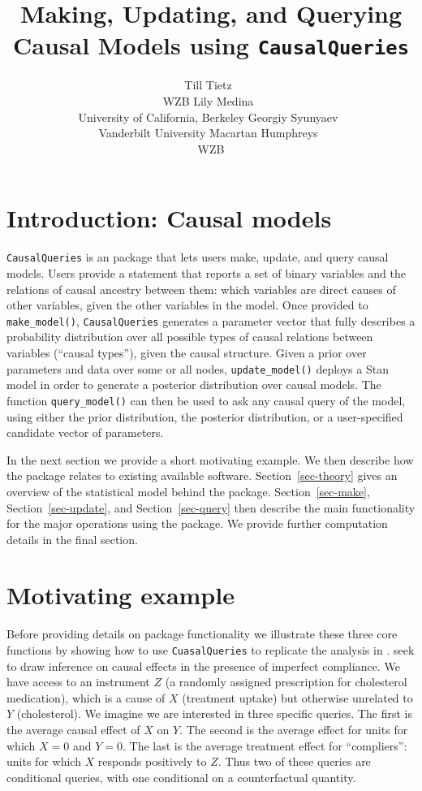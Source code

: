 \documentclass[
  11pt,
  article]{jss}
\author{Till Tietz~\orcidlink{0000-0002-2916-9059}\\WZB \And Lily
Medina~\orcidlink{0009-0004-2423-524X}\\University of California,
Berkeley \AND Georgiy
Syunyaev~\orcidlink{0000-0002-4391-6313}\\Vanderbilt
University \And Macartan Humphreys~\orcidlink{0000-0001-7029-2326}\\WZB}
\title{Making, Updating, and Querying Causal Models using
\texttt{CausalQueries}}
\begin{document}
\maketitle
\hypertarget{sec-intro}{%
\section{Introduction: Causal models}\label{sec-intro}}

\texttt{CausalQueries} is an  package that lets users make,
update, and query causal models. Users provide a statement that reports
a set of binary variables and the relations of causal ancestry between
them: which variables are direct causes of other variables, given the
other variables in the model. Once provided to \texttt{make\_model()},
\texttt{CausalQueries} generates a parameter vector that fully describes
a probability distribution over all possible types of causal relations
between variables (``causal types''), given the causal structure. Given
a prior over parameters and data over some or all nodes,
\texttt{update\_model()} deploys a Stan \citep{carpenter_stan_2017}
model in order to generate a posterior distribution over causal models.
The function \texttt{query\_model()} can then be used to ask any causal
query of the model, using either the prior distribution, the posterior
distribution, or a user-specified candidate vector of parameters.

In the next section we provide a short motivating example. We then
describe how the package relates to existing available software.
Section~\ref{sec-theory} gives an overview of the statistical model
behind the package. Section~\ref{sec-make}, Section~\ref{sec-update},
and Section~\ref{sec-query} then describe the main functionality for the
major operations using the package. We provide further computation
details in the final section.

\hypertarget{motivating-example}{%
\section{Motivating example}\label{motivating-example}}

Before providing details on package functionality we illustrate these
three core functions by showing how to use \texttt{CuasalQueries} to
replicate the analysis in
\citetext{\citealp{chickering_clinicians_1996}; \citealp[see
also][]{humphreys_integrated_2023}}. \citet{chickering_clinicians_1996}
seek to draw inference on causal effects in the presence of imperfect
compliance. We have access to an instrument \(Z\) (a randomly assigned
prescription for cholesterol medication), which is a cause of \(X\)
(treatment uptake) but otherwise unrelated to \(Y\) (cholesterol). We
imagine we are interested in three specific queries. The first is the
average causal effect of \(X\) on \(Y\). The second is the average
effect for units for which \(X=0\) and \(Y=0\). The last is the average
treatment effect for ``compliers'': units for which \(X\) responds
positively to \(Z\). Thus two of these queries are conditional queries,
with one conditional on a counterfactual quantity.
\end{document}
